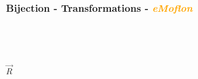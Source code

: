 \documentclass{beamer}
\begin{document}
\begin{frame}
\frametitle{Bijection - \textbf{Transformations} - \textbf{\textit{\textcolor{orange}{eMoflon}}}}
\begin{figure}[ht]
    \centering
    \mbox{\qquad\qquad\qquad
          }
    \label{fig:T1}
\end{figure}
~\\

\begin{center}
$\overrightarrow{R}$
\end{center}


\end{frame}
\end{document}
